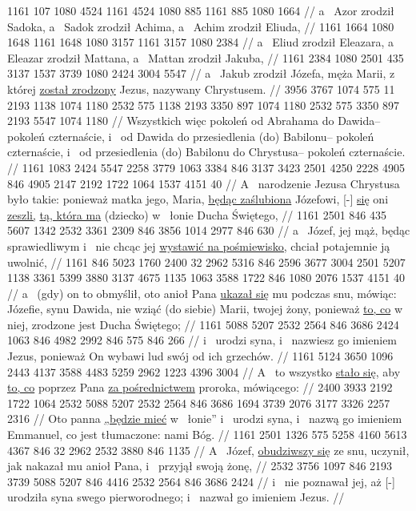 {} 1161 107 1080 4524 1161 4524 1080 885 1161 885 1080 1664
//
\glb
{} a~ Azor zrodził Sadoka, a~ Sadok zrodził Achima, a~ Achim zrodził Eliuda,
//
\endgl
\begingl
\gla
{} 1161 1664 1080 1648 1161 1648 1080 3157 1161 3157 1080 2384
//
\glb
{} a~ Eliud zrodził Eleazara, a~ Eleazar zrodził Mattana, a~ Mattan zrodził Jakuba,
//
\endgl
\begingl
\gla
{} 1161 2384 1080 2501 435 3137 1537 3739 1080 2424 3004 5547
//
\glb
{} a~ Jakub zrodził Józefa, męża Marii, z~ której \underline{został zrodzony} Jezus, nazywany Chrystusem.
//
\endgl
\begingl
\gla
{} 3956 3767 1074 575 11 2193 1138 1074 1180 2532 575 1138 2193 3350 {} 897 1074 1180 2532 575 3350 {} 897 2193 5547 1074 1180
//
\glb
{} Wszystkich więc pokoleń od Abrahama do Dawida– pokoleń czternaście, i~ od Dawida do przesiedlenia (do) Babilonu– pokoleń czternaście, i~ od przesiedlenia (do) Babilonu do Chrystusa– pokoleń czternaście.
//
\endgl
\begingl
\gla
{} 1161 1083 2424 5547 2258 3779 1063 3384 846 3137 3423 2501 4250 2228 4905 846 4905 2147 2192 {} 1722 1064 1537 4151 40
//
\glb
{} A~ narodzenie Jezusa Chrystusa było takie: ponieważ matka jego, Maria, \underline{będąc zaślubiona} Józefowi,  [-] \underline{się} oni \underline{zeszli,}  \underline{tą, która ma} (dziecko) w~ łonie  Ducha Świętego,
//
\endgl
\begingl
\gla
{} 1161 2501 846 435 5607 1342 2532 3361 2309 846 3856 1014 2977 846 630
//
\glb
{} a~ Józef, jej mąż, będąc sprawiedliwym i~ nie chcąc jej \underline{wystawić na pośmiewisko,} chciał potajemnie ją uwolnić,
//
\endgl
\begingl
\gla
{} 1161 {} 846 5023 1760 2400 32 2962 5316 846 2596 3677 3004 2501 5207 1138 3361 5399 3880 {} 3137 4675 1135 1063 3588 1722 846 1080 2076 1537 4151 40
//
\glb
{} a~ (gdy) on to obmyślił, oto anioł Pana \underline{ukazał się} mu podczas snu, mówiąc: Józefie, synu Dawida, nie  wziąć (do siebie) Marii, twojej żony, ponieważ \underline{to, co} w~ niej, zrodzone jest  Ducha Świętego;
//
\endgl
\begingl
\gla
{} 1161 5088 5207 2532 2564 846 3686 2424 1063 846 4982 2992 846 575 846 266
//
\glb
{} i~ urodzi syna, i~ nazwiesz go imieniem Jezus, ponieważ On wybawi lud swój od ich grzechów.
//
\endgl
\begingl
\gla
{} 1161 5124 3650 1096 2443 4137 3588 4483 5259 2962 1223 4396 3004
//
\glb
{} A~ to wszystko \underline{stało się,} aby  \underline{to, co}  poprzez Pana \underline{za pośrednictwem} proroka, mówiącego:
//
\endgl
\begingl
\gla
{} 2400 3933 2192 1722 1064 2532 5088 5207 2532 2564 846 3686 1694 3739 2076 3177 3326 2257 2316
//
\glb
{} Oto panna \underline{„będzie mieć} w~ łonie” i~ urodzi syna, i~ nazwą go imieniem Emmanuel, co jest tłumaczone:  nami Bóg.
//
\endgl
\begingl
\gla
{} 1161 2501 1326 575 5258 4160 5613 4367 846 32 2962 2532 3880 846 1135
//
\glb
{} A~ Józef, \underline{obudziwszy się} ze snu, uczynił, jak nakazał mu anioł Pana, i~ przyjął swoją żonę,
//
\endgl
\begingl
\gla
{} 2532 3756 1097 846 2193 3739 5088 5207 846 4416 2532 2564 846 3686 2424
//
\glb
{} i~ nie poznawał jej, aż [-] urodziła syna swego pierworodnego; i~ nazwał go imieniem Jezus.
//
\endgl


